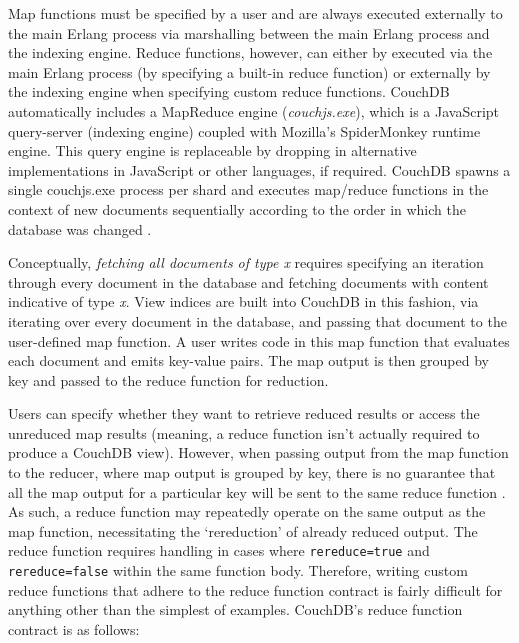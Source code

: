 Map functions must be specified by a user and are always executed externally to the main Erlang process via marshalling between the main Erlang process and the indexing engine. Reduce functions, however, can either by executed via the main Erlang process (by specifying a built-in reduce function) or externally by the indexing engine when specifying custom reduce functions. CouchDB automatically includes a MapReduce engine (\textit{couchjs.exe}), which is a JavaScript query-server (indexing engine) coupled with Mozilla's SpiderMonkey runtime engine. This query engine is replaceable by dropping in alternative implementations in JavaScript or other languages, if required. CouchDB spawns a single couchjs.exe process per shard and executes map/reduce functions in the context of new documents sequentially according to the order in which the database was changed \cite{slack2Nov,slack7Nov}.

Conceptually, \textit{fetching all documents of type x} requires specifying an iteration through every document in the database and fetching documents with content indicative of type \textit{x}. View indices are built into CouchDB in this fashion, via iterating over every document in the database, and passing that document to the user-defined map function. A user writes code in this map function that evaluates each document and emits key-value pairs. The map output is then grouped by key and passed to the reduce function for reduction.

Users can specify whether they want to retrieve reduced results or access the unreduced map results (meaning, a reduce function isn't actually required to produce a CouchDB view). However, when passing output from the map function to the reducer, where map output is grouped by key, there is no guarantee that all the map output for a particular key will be sent to the same reduce function \cite{reduceFunctions}. As such, a reduce function may repeatedly operate on the same output as the map function, necessitating the `rereduction' of already reduced output. The reduce function requires handling in cases where \texttt{rereduce=true} and \texttt{rereduce=false} within the same function body. Therefore, writing custom reduce functions that adhere to the reduce function contract is fairly difficult for anything other than the simplest of examples. CouchDB's reduce function contract is as follows:

